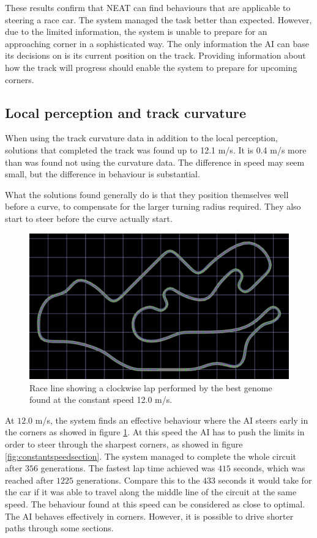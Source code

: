 \noindent
These results confirm that NEAT can find behaviours that are applicable to steering a race car. The system managed the task better than expected. However, due to the limited information, the system is unable to prepare for an approaching corner in a sophisticated way. The only information the AI can base its decisions on is its current position on the track. Providing information about how the track will progress should enable the system to prepare for upcoming corners. 


\subsection{Local perception and track curvature}
\label{subsec:fixedspeedcurvature}

When using the track curvature data in addition to the local perception, solutions that completed the track was found up to 12.1 m/s. It is 0.4 m/s more than was found not using the curvature data. The difference in speed may seem small, but the difference in behaviour is substantial.

What the solutions found generally do is that they position themselves well before a curve, to compensate for the larger turning radius required. They also start to steer before the curve actually start.

\begin{figure}[H]
\includegraphics[width=\textwidth]{report/images/fixed_curve_data}
\centering
\caption{Race line showing a clockwise lap performed by the best genome found at the constant speed 12.0 m/s.}
\label{fig:constantspeedline}
\end{figure}

\noindent
At $12.0$ m/s, the system finds an effective behaviour where the AI steers early in the corners as showed in figure \ref{fig:constantspeedline}. At this speed the AI has to push the limits in order to steer through the sharpest corners, as showed in figure \ref{fig:constantspeedsection}. The system managed to complete the whole circuit after $356$ generations. The fastest lap time achieved was $415$ seconds, which was reached after $1225$ generations. Compare this to the $433$ seconds it would take for the car if it was able to travel along the middle line of the circuit at the same speed. The behaviour found at this speed can be considered as close to optimal. The AI behaves effectively in corners. However, it is possible to drive shorter paths through some sections.

